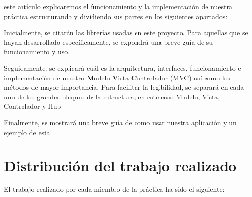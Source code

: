 \documentclass[12pt,journal,compsoc]{IEEEtran}
\begin{document}
% 
% 
 este artículo explicaremos el funcionamiento y la implementación de nuestra práctica estructurando y dividiendo sus partes en los siguientes apartados:\bigskip

Inicialmente, se citarán las librerías usadas en este proyecto. Para aquellas que se hayan desarrollado específicamente, se expondrá una breve guía de su funcionamiento y uso.\bigskip

Seguidamente, se explicará cuál es la arquitectura, interfaces, funcionamiento e implementación de nuestro \textbf{M}odelo-\textbf{V}ista-\textbf{C}ontrolador (MVC) así como los métodos de mayor importancia. Para facilitar la legibilidad, se separará en cada uno de los grandes bloques de la estructura; en este caso Modelo, Vista, Controlador y Hub\bigskip

Finalmente, se mostrará una breve guía de como usar nuestra aplicación y un ejemplo de esta.






\section{Distribución del trabajo realizado}

El trabajo realizado por cada miembro de la práctica ha sido el siguiente: \bigskip
\end{document}
